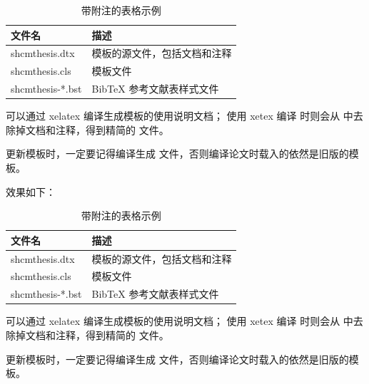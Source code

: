 \begin{python}
\begin{table}
	\centering
	\begin{threeparttable}[c]
		\caption{带附注的表格示例}
		\label{tab:three-part-table}
		\begin{tabular}{ll}
			\toprule
			文件名                 & 描述                         \\
			\midrule
			shcmthesis.dtx\tnote{a} & 模板的源文件，包括文档和注释 \\
			shcmthesis.cls\tnote{b} & 模板文件                     \\
			shcmthesis-*.bst        & BibTeX 参考文献表样式文件    \\
			\bottomrule
		\end{tabular}
		\begin{tablenotes}
			\item [a] 可以通过 xelatex 编译生成模板的使用说明文档；
			使用 xetex 编译  时则会从  中去除掉文档和注释，得到精简的  文件。
			\item [b] 更新模板时，一定要记得编译生成  文件，否则编译论文时载入的依然是旧版的模板。
		\end{tablenotes}
	\end{threeparttable}
\end{table}
\end{python}

效果如下：

\begin{table}[H]
	\centering
	\begin{threeparttable}[c]
		\caption{带附注的表格示例}
		\label{tab:three-part-table}
		\begin{tabular}{ll}
			\toprule
			文件名                 & 描述                         \\
			\midrule
			shcmthesis.dtx\tnote{a} & 模板的源文件，包括文档和注释 \\
			shcmthesis.cls\tnote{b} & 模板文件                     \\
			shcmthesis-*.bst        & BibTeX 参考文献表样式文件    \\
			\bottomrule
		\end{tabular}
		\begin{tablenotes}
			\item [a] 可以通过 xelatex 编译生成模板的使用说明文档；
			使用 xetex 编译  时则会从  中去除掉文档和注释，得到精简的 \file{.cls} 文件。
			\item [b] 更新模板时，一定要记得编译生成  文件，否则编译论文时载入的依然是旧版的模板。
		\end{tablenotes}
	\end{threeparttable}
\end{table}

